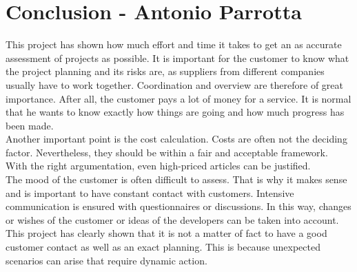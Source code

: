 \section{Conclusion - Antonio Parrotta}
This project has shown how much effort and time it takes to get an as accurate assessment of projects as possible. It is important for the customer to know what the project planning and its risks are, as suppliers from different companies usually have to work together. Coordination and overview are therefore of great importance. After all, the customer pays a lot of money for a service. It is normal that he wants to know exactly how things are going and how much progress has been made. 
\\
Another important point is the cost calculation. Costs are often not the deciding factor. Nevertheless, they should be within a fair and acceptable framework. With the right argumentation, even high-priced articles can be justified.
\\
The mood of the customer is often difficult to assess. That is why it makes sense and is important to have constant contact with customers. Intensive communication is ensured with questionnaires or discussions. In this way, changes or wishes of the customer or ideas of the developers can be taken into account.
\\
This project has clearly shown that it is not a matter of fact to have a good customer contact as well as an exact planning. This is because unexpected scenarios can arise that require dynamic action.